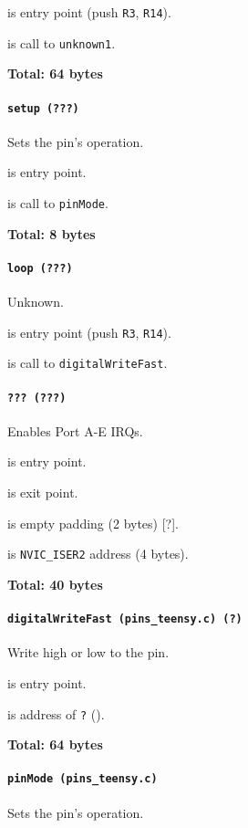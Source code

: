  is entry point (push \texttt{R3}, \texttt{R14}).

 is call to \texttt{unknown1}.

\textbf{Total: 64 bytes}

\paragraph{\texttt{setup (???)}} Sets the pin's operation.

 is entry point.

 is call to \texttt{pinMode}.

\textbf{Total: 8 bytes}

\paragraph{\texttt{loop (???)}} Unknown.

 is entry point (push \texttt{R3}, \texttt{R14}).

 is call to \texttt{digitalWriteFast}.

\paragraph{\texttt{??? (???)}} Enables Port A-E IRQs.

 is entry point.

 is exit point.

 is empty padding (2 bytes) [?].

 is \texttt{NVIC\_ISER2} address (4 bytes).

\textbf{Total: 40 bytes}

\paragraph{\texttt{digitalWriteFast (pins\_teensy.c) (?)}} Write high or low to the
pin.

 is entry point.

 is address of \texttt{?} ().

\textbf{Total: 64 bytes}

\paragraph{\texttt{pinMode (pins\_teensy.c)}} Sets the pin's operation.


